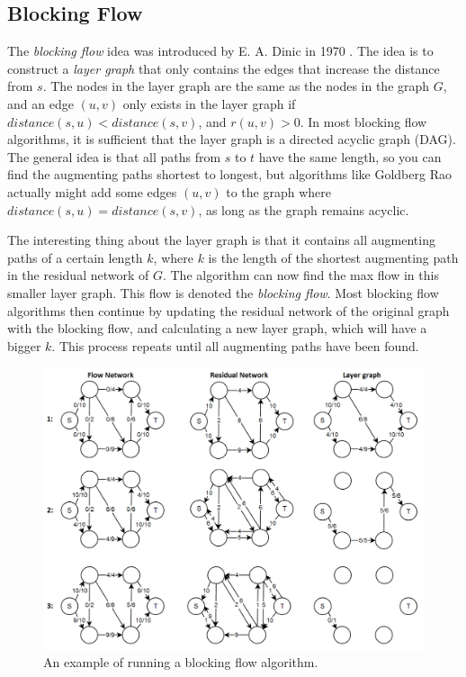 \subsection{Blocking Flow}

The \emph{blocking flow} idea was introduced by E. A. Dinic in 1970 \cite{dinic1970}.
The idea is to construct a \emph{layer graph} that only contains the edges that increase the distance from $s$.
The nodes in the layer graph are the same as the nodes in the graph $G$,
and an edge $(u, v)$ only exists in the layer graph if $distance(s, u) < distance(s, v)$, and $r(u, v) > 0$.
In most blocking flow algorithms, it is sufficient that the layer graph is a directed acyclic graph (DAG).
The general idea is that all paths from $s$ to $t$ have the same length, so you can find the augmenting paths shortest to longest,
but algorithms like Goldberg Rao \cite{Goldberg1998} actually might add some edges $(u, v)$ to the graph where $distance(s, u) = distance(s, v)$,
as long as the graph remains acyclic.

The interesting thing about the layer graph is that it contains all augmenting paths of a certain length $k$, where $k$ is the length of the shortest augmenting path in the residual network of $G$.
The algorithm can now find the max flow in this smaller layer graph. This flow is denoted the \emph{blocking flow}.
Most blocking flow algorithms then continue by updating the residual network of the original graph with the blocking flow, and calculating a new layer graph, which will have a bigger $k$.
This process repeats until all augmenting paths have been found.

\begin{figure}[!ht]
\centering
\includegraphics[width=120mm]{dinicExample.png}
\caption{An example of running a blocking flow algorithm.}
\label{dinicExample}
\end{figure}


